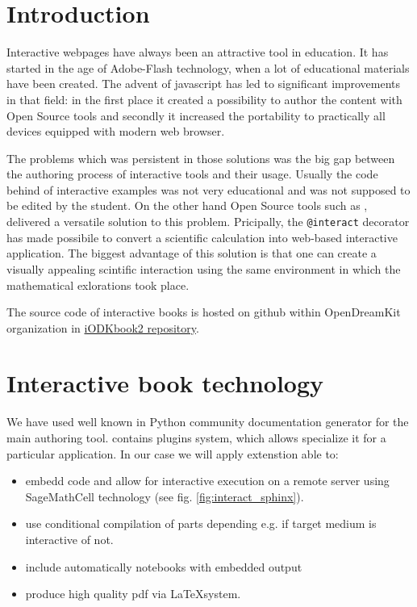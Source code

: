 \documentclass{deliverablereport}
\author{Marcin Kostur, Jerzy Łuczka, Jan Aksamit, Jolanta Marzec}
\begin{document}
\maketitle



\section{Introduction}

Interactive webpages have always been an attractive tool in
education. It has started in the age of Adobe-Flash technology, when a
lot of educational materials have been created. The advent of
javascript has led to significant improvements in that field: in the
first place it created a possibility to author the content with
Open Source tools and secondly it increased the portability to
practically all devices equipped with modern web browser.

The problems which was persistent in those solutions was the big gap
between the authoring process of interactive tools and their
usage. Usually the code behind of interactive examples was not very
educational and was not supposed to be edited by the student. On the
other hand Open Source tools such as \Sage, delivered a versatile
solution to this problem. Pricipally, the \texttt{@interact} decorator
has made possibile to convert a scientific calculation into web-based
interactive application. The biggest advantage of this solution is
that one can create a visually appealing scintific interaction using
the same environment in which the mathematical exlorations took place.

The source code of interactive books is hosted on github within
OpenDreamKit organization in
\href{https://github.com/OpenDreamKit/iODKbook2}{iODKbook2 repository}.


\section{Interactive book technology}

We have used well known in Python community \Sphinx documentation
generator for the main authoring tool. \Sphinx contains plugins system,
which allows specialize it for a particular application. In our case
we will apply extenstion able to: 

\begin{itemize}
\item embedd \Sage code and allow for interactive execution on a
  remote server using SageMathCell technology (see
  fig. \ref{fig:interact_sphinx}).
\item use conditional compilation of parts depending e.g. if target
  medium is interactive of not.
\item include automatically \Jupyter notebooks with embedded output
\item produce high quality pdf via \LaTeX system.
\end{itemize}  
\end{document}
